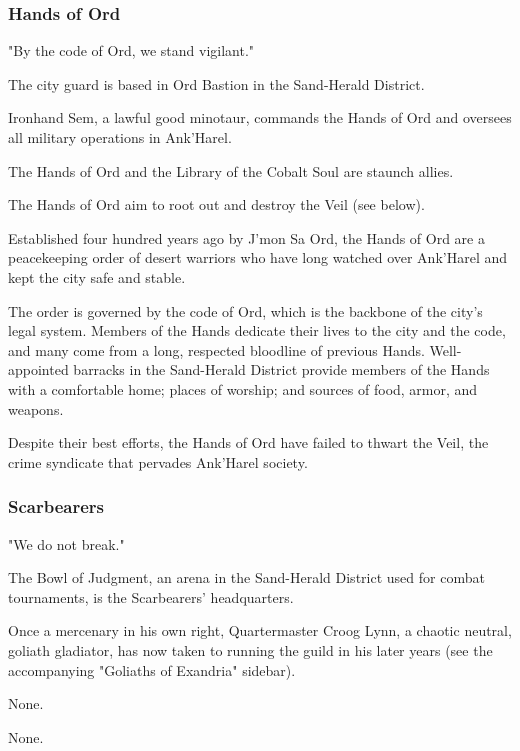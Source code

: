 \documentclass[10pt,a4paper,twoside,twocolumn,openany,nodeprecatedcode]{dndbook}
\begin{document}
\subsubsection{Hands of Ord}
"By the code of Ord, we stand vigilant."


\begin{description}[nolistsep]
\item[Headquarters.]
The city guard is based in Ord Bastion in the Sand-Herald District.
\item[Leader.]
Ironhand Sem, a lawful good minotaur, commands the Hands of Ord and oversees all military operations in Ank'Harel.
\item[Allies.]
The Hands of Ord and the Library of the Cobalt Soul are staunch allies.
\item[Opponents.]
The Hands of Ord aim to root out and destroy the Veil (see below).
\end{description}

Established four hundred years ago by J'mon Sa Ord, the Hands of Ord are a peacekeeping order of desert warriors who have long watched over Ank'Harel and kept the city safe and stable.

The order is governed by the code of Ord, which is the backbone of the city's legal system. Members of the Hands dedicate their lives to the city and the code, and many come from a long, respected bloodline of previous Hands. Well-appointed barracks in the Sand-Herald District provide members of the Hands with a comfortable home; places of worship; and sources of food, armor, and weapons.

Despite their best efforts, the Hands of Ord have failed to thwart the Veil, the crime syndicate that pervades Ank'Harel society.

\subsubsection{Scarbearers}
"We do not break."


\begin{description}[nolistsep]
\item[Headquarters.]
The Bowl of Judgment, an arena in the Sand-Herald District used for combat tournaments, is the Scarbearers' headquarters.
\item[Leader.]
Once a mercenary in his own right, Quartermaster Croog Lynn, a chaotic neutral, goliath gladiator, has now taken to running the guild in his later years (see the accompanying "Goliaths of Exandria" sidebar).
\item[Allies.]
None.
\item[Opponents.]
None.
\end{description}
\end{document}
